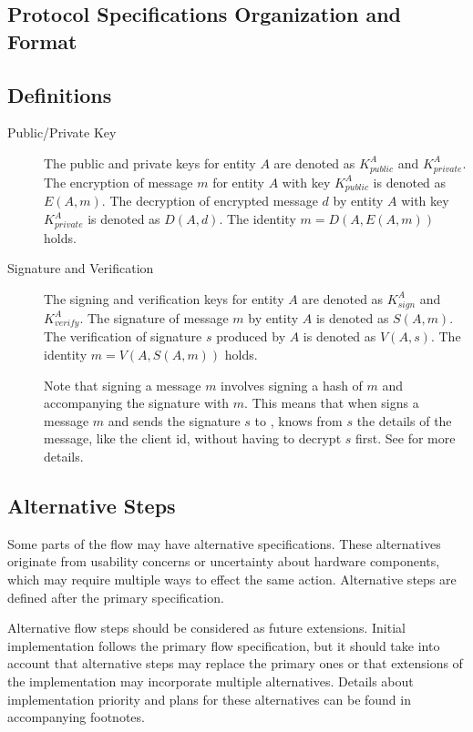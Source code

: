 \documentclass[a4paper,10pt,draft]{article}
\begin{document}
\subsection{Protocol Specifications Organization and Format}

\subsection{Definitions}\label{sec:definitions}

\begin{description}
 \item[Public/Private Key] The public and private keys for entity $A$ are denoted as $K_{public}^A$ and $K_{private}^A$. The encryption of message $m$ for entity $A$ with key 
$K_{public}^A$ is denoted as $E(A,m)$. The decryption of encrypted message $d$ by entity $A$ with key $K_{private}^A$ is denoted as $D(A,d)$. The identity $m=D(A,E(A,m))$ holds.
 \item[Signature and Verification] The signing and verification keys for entity $A$ are denoted as $K_{sign}^A$ and $K_{verify}^A$. The signature of message $m$ by entity $A$ is 
denoted as $S(A,m)$. The verification of signature $s$ produced by $A$ is denoted as $V(A,s)$. The identity $m=V(A,S(A,m))$ holds.

Note that signing a message $m$ involves signing a hash of $m$ and accompanying the signature with $m$. This means that when \Client{} signs a message $m$ and sends the signature 
$s$ to \Server{}, \Server{} knows from $s$ the details of the message, like the client id, without having to decrypt $s$ first. See \cite{crypto_spec} for more details.
\end{description}

\subsection{Alternative Steps}
Some parts of the flow may have alternative specifications. These alternatives originate from usability concerns or uncertainty about hardware components, which may require 
multiple ways to effect the same action. Alternative steps are defined after the primary specification.

Alternative flow steps should be considered as future extensions. Initial implementation follows the primary flow specification, but it should take into account that alternative 
steps may replace the primary ones or that extensions of the implementation may incorporate multiple alternatives. Details about implementation priority and plans for these 
alternatives can be found in accompanying footnotes.
\end{document}
